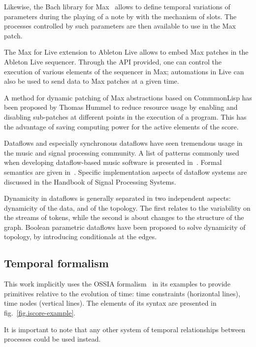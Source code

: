 \documentclass{article}
\begin{document}
Likewise, the Bach library for Max~\cite{agostini2015max} allows to define temporal variations of parameters during the playing of a note by with the mechanism of slots.
The processes controlled by such parameters are then available to use in the Max patch.

The Max for Live extension to Ableton Live allows to embed Max patches in the Ableton Live sequencer. 
Through the API provided, one can control the execution of various elements of the sequencer in Max; automations in Live can also be used to send data to Max patches at a given time.

A method for dynamic patching of Max abstractions based on CommmonLisp has been proposed by Thomas Hummel\cite{hummel1994common} to reduce resource usage by enabling and disabling sub-patches at different points in the execution of a program.
This has the advantage of saving computing power for the active elements of the score.

Dataflows and especially synchronous dataflows have seen tremendous usage in the music and signal processing community. 
A list of patterns commonly used when developing dataflow-based music software is presented in~\cite{arumi2006dataflow}.
Formal semantics are given in~\cite{benveniste_data-flow_1993}.
Specific implementation aspects of dataflow systems are discussed in the Handbook of Signal Processing Systems\cite{bhattacharyya_handbook_2013}. 

Dynamicity in dataflows is generally separated in two independent aspects: dynamicity of the data, and of the topology.
The first relates to the variability on the streams of tokens, while the second is about changes to the structure of the graph. 
Boolean parametric dataflows\cite{bempelis2015boolean} have been proposed to solve dynamicity of topology, by introducing conditionals at the edges.

\subsection{Temporal formalism}

This work implicitly uses the OSSIA formalism~\cite{celerier2015ossia} in its examples to provide primitives relative to the evolution of time: time constraints (horizontal lines), time nodes (vertical lines). 
The elements of its syntax are presented in fig.~\ref{fig.iscore-example}.

It is important to note that any other system of temporal relationships between processes could be used instead.
\end{document}

